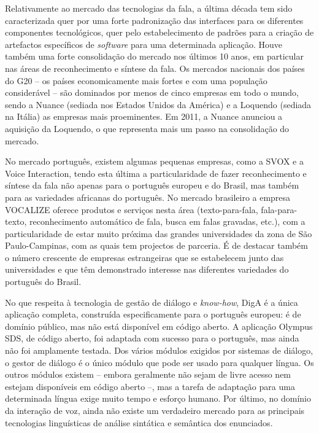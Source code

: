\documentclass[]{../metanetpaper}
\begin{document}
\begin{multicols}{2}
Relativamente ao mercado das tecnologias da fala, a última década tem sido caracterizada quer por uma forte padronização das interfaces para os di\-fe\-ren\-tes componentes tecnológicos, quer pelo es\-ta\-be\-le\-ci\-men\-to de padrões para a criação de artefactos específicos de \textit{software} para uma determinada aplicação. Houve também uma forte consolidação do mercado nos últimos 10 anos, em particular nas áreas de reconhecimento e síntese da fala. Os mercados nacionais dos países do G20 – os países economicamente mais fortes e com uma população considerável – são dominados por menos de cinco empresas em todo o mundo, sendo a Nuance (sediada nos Estados Unidos da América) e a Loquendo (sediada na Itália) as empresas mais proeminentes. Em 2011, a Nuance anunciou a aquisição da Loquendo, o que representa mais um passo na consolidação do mercado.

No mercado português, existem algumas pequenas empresas, como a SVOX e a Voice Interaction, tendo esta última a particularidade de fazer reconhecimento e síntese da fala não apenas para o português europeu e do Brasil, mas também para as variedades africanas do português. No mercado brasileiro a empresa VOCALIZE oferece produtos e serviços nesta área (texto-para-fala, fala-para-texto, reconhecimento automático de fala, busca em falas gravadas, etc.), com a particularidade de estar muito próxima das grandes universidades da zona de São Paulo-Campinas\cite{neto}, com as quais tem projectos de parceria. É de destacar também o número crescente de empresas estrangeiras que se estabelecem junto das universidades e que têm demonstrado interesse nas diferentes variedades do português do Brasil.

No que respeita à tecnologia de gestão de diá\-lo\-go e \textit{know-how}, DigA é a única aplicação completa, construída especificamente para o português europeu: é de domínio público, mas não está disponível em código aberto. A aplicação Olympus SDS, de código aberto, foi adaptada com sucesso para o português, mas ainda não foi amplamente testada. Dos vários módulos exigidos por sistemas de diálogo, o gestor de diálogo é o único módulo que pode ser usado para qualquer língua. Os outros módulos existem – embora geralmente não sejam de livre acesso nem estejam disponíveis em código aberto –, mas a tarefa de adaptação para uma determinada língua exige muito tempo e esforço humano. Por último, no domínio da interação de voz, ainda não existe um verdadeiro mercado para as principais tecnologias linguísticas de análise sintática e semântica dos enunciados.


\end{multicols}
\end{document}
